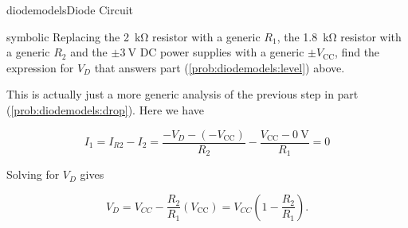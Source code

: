 \begin{mainquestion}{diodemodels}{Diode Circuit}
\begin{partquestion}{symbolic}
{Replacing the \qty{2}{\kilo\ohm} resistor with a generic $R_1$, the \qty{1.8}{\kilo\ohm} resistor with a generic $R_2$ and the $\pm\qty{3}{\volt}$ DC power supplies with a generic $\pm V_{\text{CC}}$, find the expression for $V_D$ that answers part (\cref{prob:diodemodels:level}) above.}
\begin{answer}
This is actually just a more generic analysis of the previous step in part (\cref{prob:diodemodels:drop}). Here we have

\[
I_1
=
I_{R2}
-
I_2
=
\frac{-V_D-(-V_{\text{CC}})}{R_2}
-
\frac{V_{\text{CC}}-\qty{0}{\volt}}{R_1}
=
0
\]

Solving for $V_D$ gives

\[
V_D
=
V_{CC}
-
\frac{R_2}{R_1}\left(V_{\text{CC}}\right)
=
V_{CC}\left(1-\frac{R_2}{R_1}\right).
\]
\end{answer}
\end{partquestion}

\end{mainquestion}